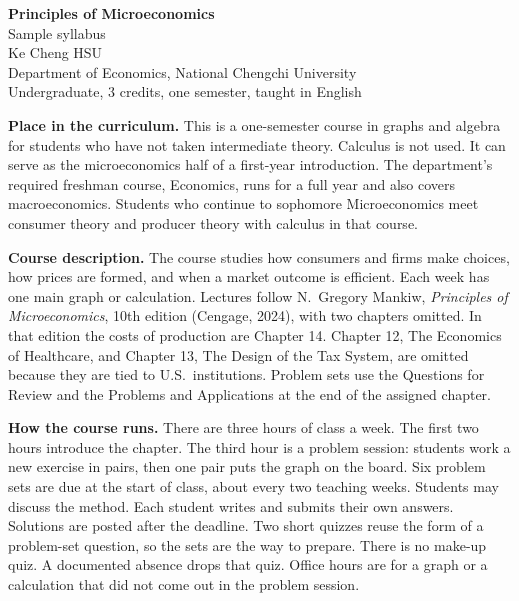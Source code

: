 \documentclass[11pt]{article}
\begin{document}
\begin{center}
{\Large\bfseries Principles of Microeconomics}\\[0.3em]
Sample syllabus\\[0.15em]
Ke Cheng HSU\\
Department of Economics, National Chengchi University\\
Undergraduate, 3 credits, one semester, taught in English
\end{center}

\textbf{Place in the curriculum.}
This is a one-semester course in graphs and algebra for students who have not taken intermediate theory. Calculus is not used. It can serve as the microeconomics half of a first-year introduction. The department's required freshman course, Economics, runs for a full year and also covers macroeconomics. Students who continue to sophomore Microeconomics meet consumer theory and producer theory with calculus in that course.

\textbf{Course description.}
The course studies how consumers and firms make choices, how prices are formed, and when a market outcome is efficient. Each week has one main graph or calculation. Lectures follow N.\ Gregory Mankiw, \emph{Principles of Microeconomics}, 10th edition (Cengage, 2024), with two chapters omitted. In that edition the costs of production are Chapter 14. Chapter 12, The Economics of Healthcare, and Chapter 13, The Design of the Tax System, are omitted because they are tied to U.S.\ institutions. Problem sets use the Questions for Review and the Problems and Applications at the end of the assigned chapter.

\textbf{How the course runs.}
There are three hours of class a week. The first two hours introduce the chapter. The third hour is a problem session: students work a new exercise in pairs, then one pair puts the graph on the board. Six problem sets are due at the start of class, about every two teaching weeks. Students may discuss the method. Each student writes and submits their own answers. Solutions are posted after the deadline. Two short quizzes reuse the form of a problem-set question, so the sets are the way to prepare. There is no make-up quiz. A documented absence drops that quiz. Office hours are for a graph or a calculation that did not come out in the problem session.
\end{document}
